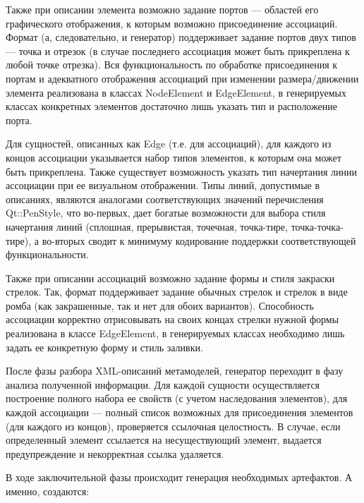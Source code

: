 \documentclass[a5paper]{article}
\begin{document}
Также при описании элемента возможно задание портов --- областей его
графического отображения, к которым возможно присоединение ассоциаций.
Формат (а, следовательно, и генератор) поддерживает задание портов двух
типов --- точка и отрезок (в случае последнего ассоциация может быть
прикреплена к любой точке отрезка). Вся функциональность по обработке
присоединения к портам и адекватного отображения ассоциаций при
изменении размера/движении элемента реализована в классах
NodeElement и EdgeElement, в генерируемых классах
конкретных элементов достаточно лишь указать тип и расположение порта.

Для сущностей, описанных как Edge (т.е. для
ассоциаций), для каждого из концов ассоциации указывается набор типов
элементов, к которым она может быть прикреплена. Также существует
возможность указать тип начертания линии ассоциации при ее визуальном
отображении. Типы линий, допустимые в описаниях, являются аналогами
соответствующих значений перечисления Qt::PenStyle, что
во-первых, дает богатые возможности для выбора стиля начертания линий
(сплошная, прерывистая, точечная, точка-тире, точка-точка-тире), а
во-вторых сводит к минимуму кодирование поддержки соответствующей
функциональности.

Также при описании ассоциаций возможно задание формы и стиля закраски
стрелок. Так, формат поддерживает задание обычных стрелок и стрелок в
виде ромба (как закрашенные, так и нет для обоих вариантов).
Способность ассоциации корректно отрисовывать на своих концах стрелки
нужной формы реализована в классе EdgeElement, в генерируемых классах
необходимо лишь задать ее конкретную форму и стиль заливки.

После фазы разбора XML-описаний
метамоделей, генератор переходит в фазу анализа полученной информации.
Для каждой сущности осуществляется построение полного набора ее свойств
(с учетом наследования элементов), для каждой ассоциации ---
полный список возможных для присоединения элементов (для каждого из
концов), проверяется ссылочная целостность. В случае, если определенный
элемент ссылается на несуществующий элемент, выдается предупреждение и
некорректная ссылка удаляется. 

В ходе заключительной фазы происходит генерация необходимых артефактов.
А именно, создаются:
\end{document}
